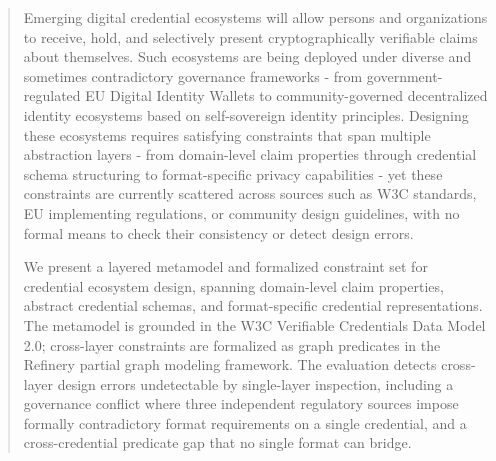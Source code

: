 \begin{abstract}
 Emerging digital credential ecosystems will allow persons and organizations to receive, hold, and selectively present cryptographically verifiable claims about themselves. Such ecosystems are being deployed under diverse and sometimes contradictory governance frameworks - from government-regulated EU Digital Identity Wallets to community-governed decentralized identity ecosystems based on self-sovereign identity principles. Designing these ecosystems requires satisfying constraints that span multiple abstraction layers - from domain-level claim properties through credential schema structuring to format-specific privacy capabilities - yet these constraints are currently scattered across sources such as W3C standards, EU implementing regulations, or community design guidelines, with no formal means to check their consistency or detect design errors.
 
 We present a layered metamodel and formalized constraint set for credential ecosystem design, spanning domain-level claim properties, abstract credential schemas, and format-specific credential representations. The metamodel is grounded in the W3C Verifiable Credentials Data Model 2.0; cross-layer constraints are formalized as graph predicates in the Refinery partial graph modeling framework. The evaluation detects cross-layer design errors undetectable by single-layer inspection, including a governance conflict where three independent regulatory sources impose formally contradictory format requirements on a single credential, and a cross-credential predicate gap that no single format can bridge.
\end{abstract}